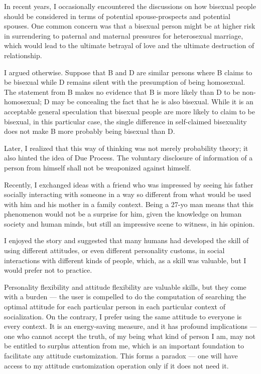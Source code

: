 
\begin{multicols*}{2}
	In recent years, I occasionally encountered the discussions on how bisexual people should be considered
	in terms of potential spouse-prospects and potential spouses.
	One common concern was that a bisexual person might be at higher risk in
	surrendering to paternal and maternal pressures for heterosexual marriage,
    which would lead to the ultimate betrayal of love and the ultimate destruction of relationship.

	I argued otherwise.
	Suppose that B and D are similar persons where B claims to be bisexual while D remains silent with the presumption of being homosexual.
	The statement from B makes no evidence that B is more likely than D to be non-homosexual;
	D may be concealing the fact that he is also bisexual.
	While it is an acceptable general speculation that bisexual people are more likely to claim to be bisexual,
	in this particular case, the single difference in self-claimed bisexuality does not make B more probably being bisexual than D.

	Later, I realized that this way of thinking was not merely probability theory; it also hinted the idea of Due Process.
	The voluntary disclosure of information of a person from himself shall not be weaponized against himself.

	Recently, I exchanged ideas with a friend who was impressed by seeing his father socially interacting with someone
    in a way so different from what would be used with him and his mother in a family context.
    Being a 27-yo man means that this phenomenon would not be a surprise for him,
    given the knowledge on human society and human minds, but still an impressive scene to witness, in his opinion.

    I enjoyed the story and suggested that many humans had developed the skill of using different attitudes,
    or even different personality customs, in social interactions with different kinds of people,
    which, as a skill was valuable, but I would prefer not to practice.

    Personality flexibility and attitude flexibility are valuable skills, but they come with a burden ---
    the user is compelled to do the computation of searching the optimal attitude
    for each particular person in each particular context of socialization.
    On the contrary, I prefer using the same attitude to everyone is every context.
    It is an energy-saving measure, and it has profound implications ---
    one who cannot accept the truth, of my being what kind of person I am, may not be entitled to surplus attention from me,
    which is an important foundation to facilitate any attitude customization.
    This forms a paradox --- one will have access to my attitude customization operation only if it does not need it.


\end{multicols*}

